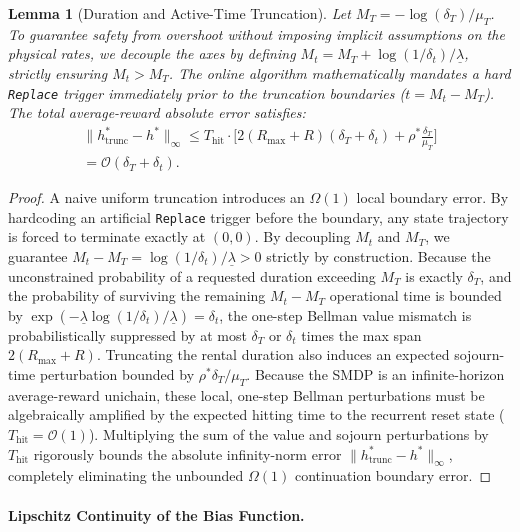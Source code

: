 \documentclass[letterpaper, 10 pt, conference]{IEEEconf}
\newtheorem{lemma}{Lemma}
\begin{document}
\begin{lemma}[Duration and Active-Time Truncation]
    \label{lem:truncation_T}
    Let $M_T = -\log(\delta_T)/\mu_T$. To guarantee safety from overshoot without imposing implicit assumptions on the physical rates, we decouple the axes by defining $M_t = M_T + \log(1/\delta_t)/\underline{\lambda}$, strictly ensuring $M_t > M_T$. The online algorithm mathematically mandates a hard \texttt{Replace} trigger immediately prior to the truncation boundaries ($t = M_t - M_T$). The total average-reward absolute error satisfies:
    \begin{multline}
        \|h^*_{\mathrm{trunc}} - h^*\|_\infty \leq T_{\mathrm{hit}} \cdot \bigg[ 2(R_{\max}+R)(\delta_T + \delta_t) + \rho^* \frac{\delta_T}{\mu_T} \bigg] \\
        = \mathcal{O}(\delta_T + \delta_t).
    \end{multline}
\end{lemma}

\begin{proof}
    A naive uniform truncation introduces an $\Omega(1)$ local boundary error. By hardcoding an artificial \texttt{Replace} trigger before the boundary, any state trajectory is forced to terminate exactly at $(0,0)$. By decoupling $M_t$ and $M_T$, we guarantee $M_t - M_T = \log(1/\delta_t)/\underline{\lambda} > 0$ strictly by construction. Because the unconstrained probability of a requested duration exceeding $M_T$ is exactly $\delta_T$, and the probability of surviving the remaining $M_t - M_T$ operational time is bounded by $\exp(-\underline{\lambda} \log(1/\delta_t)/\underline{\lambda}) = \delta_t$, the one-step Bellman value mismatch is probabilistically suppressed by at most $\delta_T$ or $\delta_t$ times the max span $2(R_{\max} + R)$. Truncating the rental duration also induces an expected sojourn-time perturbation bounded by $\rho^* \delta_T / \mu_T$. Because the SMDP is an infinite-horizon average-reward unichain, these local, one-step Bellman perturbations must be algebraically amplified by the expected hitting time to the recurrent reset state ($T_{\mathrm{hit}} = \mathcal{O}(1)$). Multiplying the sum of the value and sojourn perturbations by $T_{\mathrm{hit}}$ rigorously bounds the absolute infinity-norm error $\|h^*_{\mathrm{trunc}} - h^*\|_\infty$, completely eliminating the unbounded $\Omega(1)$ continuation boundary error.
\end{proof}

\paragraph{Lipschitz Continuity of the Bias Function.}
\end{document}
